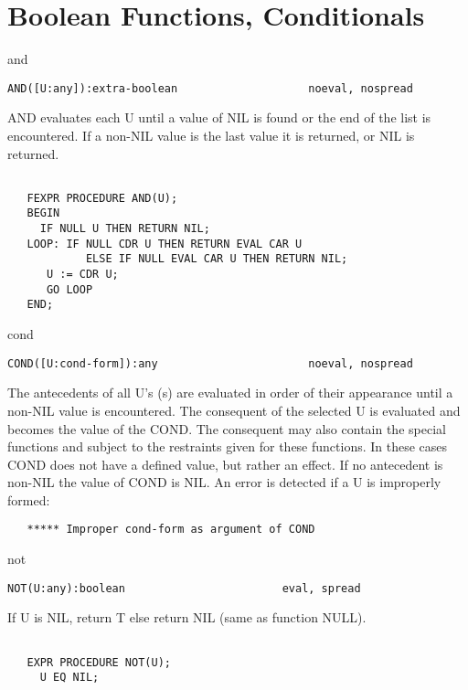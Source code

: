 \section{Boolean Functions, Conditionals}

\begin{Function}{and}
\begin{verbatim}
AND([U:any]):extra-boolean                    noeval, nospread
\end{verbatim}
   AND  evaluates each U until a value of NIL is found or the end
   of  the list is encountered.   If a non-NIL  value is the last
   value it is returned, or NIL is returned.
\begin{verbatim}

   FEXPR PROCEDURE AND(U);
   BEGIN
     IF NULL U THEN RETURN NIL;
   LOOP: IF NULL CDR U THEN RETURN EVAL CAR U
            ELSE IF NULL EVAL CAR U THEN RETURN NIL;
      U := CDR U;
      GO LOOP
   END;
\end{verbatim}

\end{Function}
\begin{Function}{cond}
\begin{verbatim}
COND([U:cond-form]):any                       noeval, nospread
\end{verbatim}
   The  antecedents of all U's (s) are  evaluated in  order of their
   appearance  until  a  non-NIL  value  is  encountered.     The
   consequent  of  the selected  U is  evaluated and  becomes the
   value  of  the  COND.  The  consequent  may  also  contain the
   special  functions  and   subject to  the restraints
   given  for these  functions.   In these cases COND  does not have
   a  defined value, but rather  an effect.   If no antecedent is
   non-NIL  the value of COND is NIL. An error is detected if a U
   is improperly formed:
\begin{verbatim}
   ***** Improper cond-form as argument of COND
\end{verbatim}
\end{Function}
\begin{Function}{not}
\begin{verbatim}
NOT(U:any):boolean                        eval, spread
\end{verbatim}
   If  U  is NIL,  return  T else  return NIL  (same  as function
   NULL).
\begin{verbatim}

   EXPR PROCEDURE NOT(U);
     U EQ NIL;
\end{verbatim}
\end{Function}
